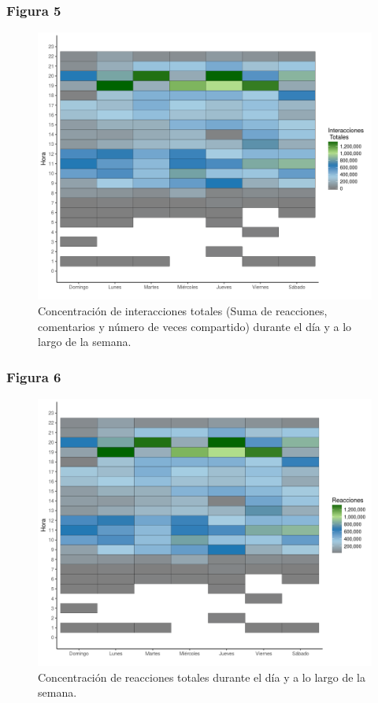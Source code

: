 \documentclass[a4paper,10pt]{article}
\begin{document}
\subsubsection{Figura 5}
\begin{figure}[H]
  \begin{center}
   \includegraphics[width=.85\textwidth]{imagenes/figura5.png}
   \captionsetup{width=.80\textwidth}
   \caption{\centering Concentración de interacciones totales 
   (Suma de reacciones, comentarios y número de veces compartido) durante el día y a 
   lo largo de la semana.} 
  \end{center} 
\end{figure}


\subsubsection{Figura 6}
\begin{figure}[H]
  \begin{center}
   \includegraphics[width=.85\textwidth]{imagenes/figura6.png}
   \captionsetup{width=.80\textwidth}
   \caption{\centering Concentración de reacciones totales durante el día y a 
   lo largo de la semana.} 
  \end{center} 
\end{figure}
\end{document}

